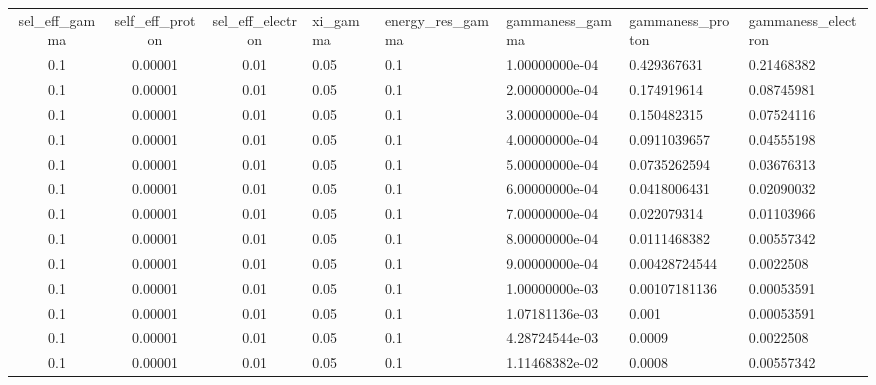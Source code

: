 \begin{table}
\begin{tabular}{ccc}
sel_eff_gamma & self_eff_proton & sel_eff_electron & xi_gamma & energy_res_gamma & gammaness_gamma & gammaness_proton & gammaness_electron \\
          0.1 &         0.00001 &             0.01 &     0.05 &              0.1 &  1.00000000e-04 &      0.429367631 &         0.21468382 \\
          0.1 &         0.00001 &             0.01 &     0.05 &              0.1 &  2.00000000e-04 &      0.174919614 &         0.08745981 \\
          0.1 &         0.00001 &             0.01 &     0.05 &              0.1 &  3.00000000e-04 &      0.150482315 &         0.07524116 \\
          0.1 &         0.00001 &             0.01 &     0.05 &              0.1 &  4.00000000e-04 &     0.0911039657 &         0.04555198 \\
          0.1 &         0.00001 &             0.01 &     0.05 &              0.1 &  5.00000000e-04 &     0.0735262594 &         0.03676313 \\
          0.1 &         0.00001 &             0.01 &     0.05 &              0.1 &  6.00000000e-04 &     0.0418006431 &         0.02090032 \\
          0.1 &         0.00001 &             0.01 &     0.05 &              0.1 &  7.00000000e-04 &      0.022079314 &         0.01103966 \\
          0.1 &         0.00001 &             0.01 &     0.05 &              0.1 &  8.00000000e-04 &     0.0111468382 &         0.00557342 \\
          0.1 &         0.00001 &             0.01 &     0.05 &              0.1 &  9.00000000e-04 &    0.00428724544 &          0.0022508 \\
          0.1 &         0.00001 &             0.01 &     0.05 &              0.1 &  1.00000000e-03 &    0.00107181136 &         0.00053591 \\
          0.1 &         0.00001 &             0.01 &     0.05 &              0.1 &  1.07181136e-03 &            0.001 &         0.00053591 \\
          0.1 &         0.00001 &             0.01 &     0.05 &              0.1 &  4.28724544e-03 &           0.0009 &          0.0022508 \\
          0.1 &         0.00001 &             0.01 &     0.05 &              0.1 &  1.11468382e-02 &           0.0008 &         0.00557342 \\

\end{tabular}
\end{table}
